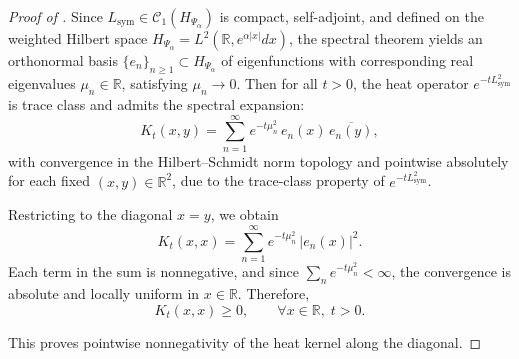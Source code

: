 \begin{proof}[Proof of ]
Since \( L_{\mathrm{sym}} \in \mathcal{C}_1(H_{\Psi_\alpha}) \) is compact, self-adjoint, and defined on the weighted Hilbert space \( H_{\Psi_\alpha} = L^2(\mathbb{R}, e^{\alpha|x|} dx) \), the spectral theorem yields an orthonormal basis \( \{e_n\}_{n \geq 1} \subset H_{\Psi_\alpha} \) of eigenfunctions with corresponding real eigenvalues \( \mu_n \in \mathbb{R} \), satisfying \( \mu_n \to 0 \). Then for all \( t > 0 \), the heat operator \( e^{-t L_{\mathrm{sym}}^2} \) is trace class and admits the spectral expansion:
\[
K_t(x,y) = \sum_{n=1}^\infty e^{-t \mu_n^2} \, e_n(x) \, \overline{e_n(y)},
\]
with convergence in the Hilbert--Schmidt norm topology and pointwise absolutely for each fixed \( (x,y) \in \mathbb{R}^2 \), due to the trace-class property of \( e^{-t L_{\mathrm{sym}}^2} \).

\medskip
\noindent
Restricting to the diagonal \( x = y \), we obtain
\[
K_t(x,x) = \sum_{n=1}^\infty e^{-t \mu_n^2} \, |e_n(x)|^2.
\]
Each term in the sum is nonnegative, and since \( \sum_n e^{-t \mu_n^2} < \infty \), the convergence is absolute and locally uniform in \( x \in \mathbb{R} \). Therefore,
\[
K_t(x,x) \geq 0, \qquad \forall x \in \mathbb{R}, \; t > 0.
\]

\medskip
\noindent
This proves pointwise nonnegativity of the heat kernel along the diagonal.
\end{proof}
